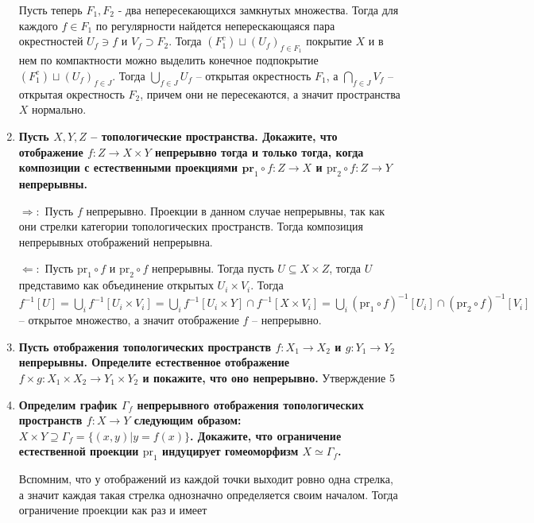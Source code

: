 \documentclass{article}
\begin{document}
\begin{enumerate}
        Пусть теперь $F_1, F_2$ - два непересекающихся замкнутых множества.
        Тогда для каждого $f\in F_1$ по регулярности найдется неперескающаяся
        пара окрестностей $U_f\ni f$ и $V_f\supset F_2$. Тогда $(F_1^c)\sqcup
        (U_f)_{f\in F_1}$ покрытие $X$ и в нем по компактности можно выделить
        конечное подпокрытие $(F_1^c)\sqcup (U_f)_{f\in J}$. Тогда $\bigcup_{f\in
        J}U_f$ – открытая окрестность $F_1$, а $\bigcap_{f\in J}V_f$ –
        открытая окрестность $F_2$, причем они не пересекаются, а значит
        пространства $X$ нормально.
    \item \textbf{Пусть $X,Y,Z$ – топологические пространства. Докажите, что
        отображение $f:Z\longrightarrow X\times Y$ непрерывно тогда и только
        тогда, когда композиции с естественными проекциями $\textbf{pr}_1\circ
        f:Z\longrightarrow X$ и $\text{pr}_2\circ f:Z\longrightarrow Y$
        непрерывны.}\par
        $\Rightarrow:$ Пусть $f$ непрерывно. Проекции в данном случае
        непрерывны, так как они стрелки категории топологических пространств.
        Тогда композиция непрерывных отображений непрерывна.\par
        $\Leftarrow:$ Пусть $\text{pr}_1\circ f$ и $\text{pr}_2\circ f$
        непрерывны. Тогда пусть $U\subseteq X\times Z$, тогда $U$ представимо
        как объединение открытых $U_i\times V_i$. Тогда $f^{-1}[U] = \bigcup_i
        f^{-1}[U_i\times V_i]=\bigcup_i f^{-1}[U_i\times Y]\cap f^{-1}[X\times
        V_i]=\bigcup_i (\text{pr}_1\circ f)^{-1}[U_i]\cap(\text{pr}_2\circ f)^
        {-1}[V_i]$ – открытое множество, а значит отображение $f$ –
        непрерывно.
    \item \textbf{Пусть отображения топологических пространств $f:X_1
        \longrightarrow X_2$ и $g:Y_1\longrightarrow Y_2$ непрерывны.
        Определите естественное отображение $f\times g:X_1\times X_2
        \longrightarrow Y_1\times Y_2$ и покажите, что оно непрерывно.}
        Утверждение 5
    \item \textbf{Определим график $\Gamma_f$ непрерывного отображения
        топологических пространств $f:X\longrightarrow Y$ следующим образом:
        $X\times Y\supseteq \Gamma_f=\{(x,y)|y=f(x)\}$. Докажите, что
        ограничение естественной проекции $\text{pr}_1$ индуцирует гомеоморфизм
        $X\simeq\Gamma_f$.}\par Вспомним, что у отображений из каждой точки
        выходит ровно одна стрелка, а значит каждая такая стрелка однозначно
        определяется своим началом. Тогда ограничение проекции как раз и имеет

\end{enumerate}
\end{document}
